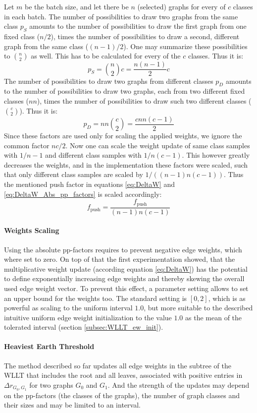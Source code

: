	Let $m$ be the batch size, and let there be $n$ (selected) graphs for every of $c$ classes in each batch.
	The number of possibilities to draw two graphs from the same class $p_S$ amounts to the number of possibilities to draw the first graph from one fixed class ($n/2$), times the number of possibilities to draw
	a second, different graph from the same class ($(n-1)/2$).
	One may summarize these possibilities to $n\choose2$ as well.
	This has to be calculated for every of the $c$ classes.
	Thus it is:
	\[ p_S = {n \choose 2} c = \frac{n(n-1)}{2} c \]
	The number of possibilities to draw two graphs from different classes $p_D$ amounts to the number of possibilities to draw two graphs, each from two different fixed classes ($nn$), times the number of possibilities to draw
	such two different classes (${c \choose 2}$).
	Thus it is:
	\[ p_D = nn{c \choose 2} = \frac{cnn(c-1)}{2} \]
	Since these factors are used only for scaling the applied weights, we ignore the common factor $nc/2$.
	Now one can scale the weight update of same class samples with $1/n-1$ and different class samples with $1/n(c-1)$.
	This however greatly decreases the weights, and in the implementation these factors were scaled, such that only different class samples are scaled by $1 / ((n-1)n(c-1))$.
	Thus the mentioned push factor in equations \ref{eq:DeltaW} and \ref{eq:DeltaW_Abs_pp_factors} is scaled accordingly: 
	\[f_{\text{push}} = \frac{ f_{\text{push}} }{ (n-1)n(c-1) }\]
	
	\paragraph{Weights Scaling}
	Using the absolute pp-factors requires to prevent negative edge weights, which where set to zero. 
	On top of that the first experimentation showed, that the multiplicative weight update (according equation \ref{eq:DeltaW}) has the potential to define exponentially increasing edge weights and thereby skewing the overall used edge weight vector.
	To prevent this effect, a parameter setting allows to set an upper bound for the weights too.
	The standard setting is $[0,2]$, which is as powerful as scaling to the uniform interval $1.0$, but more suitable to the described intuitive uniform edge weight initialization to the value $1.0$ as the mean of the tolerated interval (section \ref{subsec:WLLT_ew_init}).
	
	\paragraph{Heaviest Earth Threshold}
	The method described so far updates all edge weights in the subtree of the WLLT that includes the root and all leaves, associated with positive entries in $\Delta r_{G_0, G_1}$ for two graphs $G_0$ and $G_1$.
	And the strength of the updates may depend on the pp-factors (the classes of the graphs), the number of graph classes and their sizes and may be limited to an interval.
	
